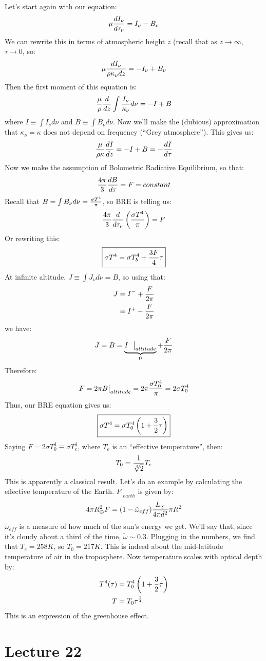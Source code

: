 \documentclass[11pt]{article}
\def\~{\tilde}
\def\inv#1{{1 \over #1}}
\def\eval#1{\big|_{#1}}
\begin{document}
Let's start again with our equation:
$$\mu{dI_\nu\over d\tau_\nu}=I_\nu-B_\nu$$
We can rewrite this in terms of atmospheric height $z$ (recall that as
$z\to\infty$, $\tau\to0$, so:
$$\mu{dI_\nu\over\rho\kappa_\nu dz}=-I_\nu+B_\nu$$
Then the first moment of this equation is:
$${\mu\over\rho}{d\over dz}\int{{I_\nu\over\kappa_\nu}d\nu}=-I+B$$
where $I\equiv\int{I_\nu d\nu}$ and $B\equiv\int{B_\nu d\nu}$.  Now we'll make
the (dubious) approximation that $\kappa_\nu=\kappa$ does not depend on
frequency (``Grey atmosphere'').  This gives us:
$${\mu\over\rho\kappa}{dI\over dz}=-I+B=-{dI\over d\tau}$$
Now we make the assumption of Bolometric Radiative Equilibrium, so that:
$${4\pi\over3}{dB\over d\tau}=F=constant$$
Recall that $B=\int{B_\nu d\nu}={\sigma T^4\over\pi}$, so BRE is telling us:
$${4\pi\over3}{d\over d\tau_\nu}\left({\sigma T^4\over\pi}\right)=F$$
Or rewriting this:
$$\boxed{\sigma T^4=\sigma T_b^4+{3F\over 4}\tau}$$
At infinite altitude, $J\equiv\int{J_\nu d\nu}=B$, so using that:
$$\begin{aligned}J&=I^-+{F\over2\pi}\\ 
&=I^+-{F\over2\pi}\\ \end{aligned}$$
we have:
$$J=B=\underbrace{I^-\eval{altitude}}_{0}+{F\over2\pi}$$
Therefore:
$$F=2\pi B\eval{altitude}=2\pi{\sigma T_0^4\over\pi}=2\sigma T_0^4$$
Thus, our BRE equation gives us:
$$\boxed{\sigma T^4=\sigma T_0^4\left(1+{3\over2}\tau\right)}$$
Saying $F=2\sigma T_0^4\equiv\sigma T_e^4$, where $T_e$ is an ``effective
temperature'', then:
$$T_0=\inv{\root 4\of{2}}T_e$$
This is apparently a classical result.  Let's do an example by calculating
the effective temperature of the Earth. $F\eval{earth}$ is given by:
$$4\pi R_\oplus^2F=(1-\~\omega_{eff}){L_\odot\over4\pi d^2}\pi R^2$$
$\~\omega_{eff}$ is a measure of how much of the sun's energy we get.  We'll
say that, since it's cloudy about a third of the time, $\~\omega\sim0.3$.
Plugging in the numbers, we find that $T_e=258K$, so $T_0=217K$.  This is
indeed about the mid-latitude temperature of air in the troposphere.  Now
temperature scales with optical depth by:
$$\begin{aligned}T^4(\tau)&=T_0^4\left(1+{3\over2}\tau\right)\\ 
T&=T_0\tau^{1\over4}\\ \end{aligned}$$
This is an expression of the greenhouse effect.

\section*{ Lecture 22 }
\end{document}
